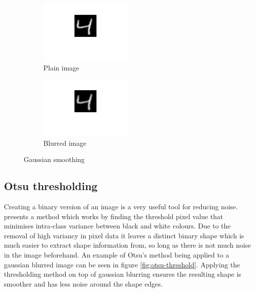 \documentclass[12pt]{article}
\begin{document}
    \begin{figure}[H]
      \begin{subfigure}{.5\textwidth}
        \centering
        \includegraphics[width=0.5\textwidth]{scaled}
        \caption{Plain image}
        \label{fig:scaled}
      \end{subfigure}
      \begin{subfigure}{.5\textwidth}
        \centering
        \includegraphics[width=0.5\textwidth]{blurred}
        \caption{Blurred image}
        \label{fig:blurred}
      \end{subfigure}
      \caption{Gaussian smoothing}
      \label{fig:gauss-filter}
    \end{figure}

  \subsection{Otsu thresholding} \label{otsu-thres}
    Creating a binary version of an image is a very useful tool for reducing noise. \cite{otsu1979threshold} presents a method which works by finding the threshold pixel value that minimises intra-class variance between black and white colours. Due to the removal of high variancy in pixel data it leaves a distinct binary shape which is much easier to extract shape information from, so long as there is not much noise in the image beforehand. An example of Otsu's method being applied to a gaussian blurred image can be seen in figure \ref{fig:otsu-threshold}. Applying the thresholding method on top of gaussian blurring ensures the resulting shape is smoother and has less noise around the shape edges.
\end{document}
